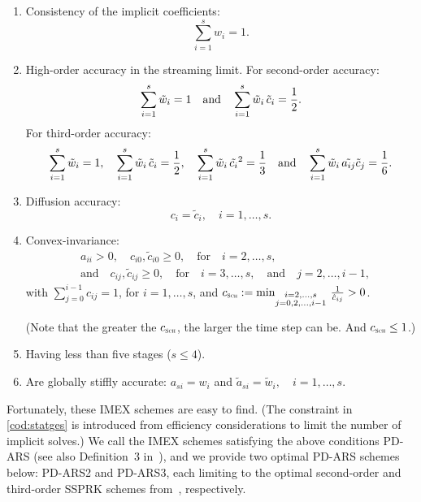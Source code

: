 \begin{enumerate}
    \item Consistency of the implicit coefficients:
    \begin{equation}
      \sum_{i=1}^{s}w_{i}=1.
    \end{equation}
    \item High-order accuracy in the streaming limit.
    For second-order accuracy:
    \begin{equation}
      \sum_{i=1}^{s}\tilde{w}_{i}=1
      \quad\text{and}\quad
      \sum_{i=1}^{s}\tilde{w}_{i}\,\tilde{c}_{i}=\frac{1}{2}.
      \label{eq:orderConditionsEx}
    \end{equation}
    For third-order accuracy: 
    \begin{equation}
    \sum_{i=1}^{s}\tilde{w}_{i}=1,
          \quad
          \sum_{i=1}^{s}\tilde{w}_{i}\,\tilde{c}_{i}=\frac{1}{2},
          \quad
          \sum_{i=1}^{s}\tilde{w}_{i}\,\tilde{c_{i}}^2 = \frac{1}{3}
          \quad\text{and}\quad
          \sum_{i=1}^{s}\tilde{w}_{i}\,\tilde{a_{ij}}\tilde{c}_{j}= \frac{1}{6}.
    \end{equation}
    \item Diffusion accuracy:
    \begin{equation}
      c_{i}=\tilde{c}_{i}, \quad i=1,\ldots,s.
      \label{eq:diffusionCondition}
    \end{equation}
    \item Convex-invariance:
    \begin{align}
      &a_{ii}>0, \quad c_{i0},\tilde{c}_{i0}\ge0, \quad \text{for} \quad i=2,\ldots,s, \nonumber \\
      &\text{and} \quad c_{ij},\tilde{c}_{ij}\ge0, \quad \text{for} \quad i=3,\ldots,s, \quad\text{and}\quad j=2,\ldots,i-1,
      \label{eq:convexInvariant}
    \end{align}
    with $\sum_{j=0}^{i-1}c_{ij}=1$, for $i=1,\ldots,s$, and $c_{\textnormal{\tiny\textsc{Sch}}}:=\min_{\substack{i = 2,\ldots,s \\ 
                  j = 0,2,\ldots,i-1}}\,\frac{1}{\hat{c}_{ij}}>0$.
                  
    (Note that the greater the $c_{\textnormal{\tiny\textsc{Sch}}}$, the larger the time step can be.
    And $c_{\textnormal{\tiny\textsc{Sch}}} \leq 1$.)
    \item Having less than five stages ($s\le4$)\label{cod:statges}.
    \item Are globally stiffly accurate: $a_{si}=w_{i}$ and $\tilde{a}_{si}=\tilde{w}_{i},\quad i=1,\ldots,s$. 
\end{enumerate}
Fortunately, these IMEX schemes are easy to find.  
(The constraint in \eqref{cod:statges} is introduced from efficiency considerations to limit the number of implicit solves.)
We call the IMEX schemes satisfying the above conditions {PD-ARS} (see also Definition~3 in~\cite{chu_etal_2018}), and we provide two optimal PD-ARS schemes below: PD-ARS2 and PD-ARS3, each limiting to the optimal second-order and third-order SSPRK schemes from~\cite{shuOsher_1988}, respectively.
